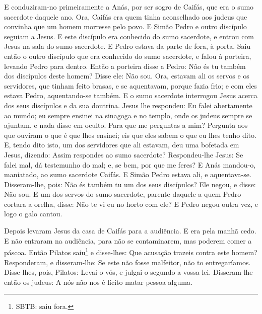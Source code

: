 E conduziram-no primeiramente a Anás, por ser sogro de Caifás,
que era o sumo sacerdote daquele ano. Ora, Caifás era quem
tinha aconselhado aos judeus que convinha que um homem morresse pelo
povo. E Simão Pedro e outro discípulo seguiam a Jesus. E este
discípulo era conhecido do sumo sacerdote, e entrou com Jesus na
sala do sumo sacerdote. E Pedro estava da parte de fora, à
porta. Saiu então o outro discípulo que era conhecido do sumo
sacerdote, e falou à porteira, levando Pedro para dentro.
Então a porteira disse a Pedro: Não és tu também dos
discípulos deste homem? Disse ele: Não sou. Ora, estavam ali
os servos e os servidores, que tinham feito brasas, e se aquentavam,
porque fazia frio; e com eles estava Pedro, aquentando-se também.
E o sumo sacerdote interrogou Jesus acerca dos seus
discípulos e da sua doutrina. Jesus lhe respondeu: Eu falei
abertamente ao mundo; eu sempre ensinei na sinagoga e no templo,
onde os judeus sempre se ajuntam, e nada disse em oculto.
Para que me perguntas a mim? Pergunta aos que ouviram o que é
que lhes ensinei; eis que eles sabem o que eu lhes tenho dito.
E, tendo dito isto, um dos servidores que ali estavam, deu
uma bofetada em Jesus, dizendo: Assim respondes ao sumo sacerdote?
Respondeu-lhe Jesus: Se falei mal, dá testemunho do mal; e,
se bem, por que me feres? E Anás mandou-o, maniatado, ao sumo
sacerdote Caifás. E Simão Pedro estava ali, e aquentava-se.
Disseram-lhe, pois: Não és também tu um dos seus discípulos? Ele
negou, e disse: Não sou. E um dos servos do sumo sacerdote,
parente daquele a quem Pedro cortara a orelha, disse: Não te vi eu
no horto com ele? E Pedro negou outra vez, e logo o galo
cantou.

Depois levaram Jesus da casa de Caifás para a audiência. E era
pela manhã cedo. E não entraram na audiência, para não se
contaminarem, mas poderem comer a páscoa. Então Pilatos
saiu\footnote{SBTB: saiu fora.} e disse-lhes: Que acusação trazeis
contra este homem? Responderam, e disseram-lhe: Se este não
fosse malfeitor, não to entregaríamos. Disse-lhes, pois,
Pilatos: Levai-o vós, e julgai-o segundo a vossa lei. Disseram-lhe
então os judeus: A nós não nos é lícito matar pessoa alguma.

